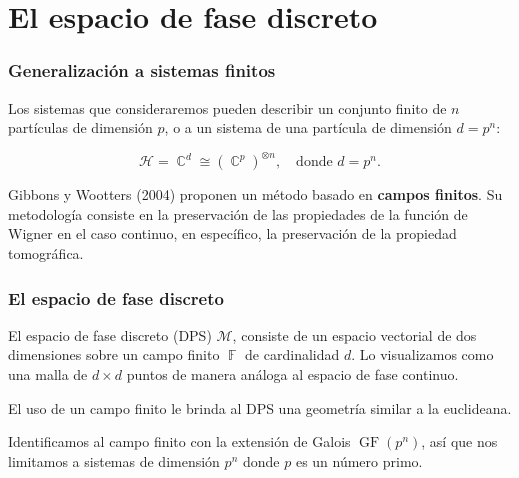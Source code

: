 \documentclass[10pt,spanish]{beamer}
\DeclareMathOperator{\C}{\mathbb{C}}
\DeclareMathOperator{\F}{\mathbb{F}}
\DeclareMathOperator{\GF}{GF}
\begin{document}
  

  
  \section{El espacio de fase discreto}

  \begin{frame}
    \frametitle{Generalización a sistemas finitos}

    Los sistemas que consideraremos pueden describir un
    conjunto finito de $n$ partículas de dimensión $p$, o a
    un sistema de una partícula de dimensión $d = p^{n}$:

    \begin{equation}
      \mathcal H
      = \C^{d}
      \cong \left( \C^{p} \right)^{\otimes n},
      \quad \text{donde } d = p^{n}.
    \end{equation}

    \vspace{15pt}

    \pause

    Gibbons y Wootters (2004) proponen un método basado en
    \textbf{campos finitos}. Su metodología consiste en la
    preservación de las propiedades de la función de Wigner
    en el caso continuo, en específico, la preservación de
    la propiedad tomográfica.
  \end{frame}

  \begin{frame}
    \frametitle{El espacio de fase discreto}

    \begin{definition}
      El espacio de fase discreto (DPS) $\mathcal M$,
      consiste de un espacio vectorial de dos dimensiones
      sobre un campo finito $\F$ de cardinalidad $d$. Lo
      visualizamos como una malla de $d \times d$ puntos de
      manera análoga al espacio de fase continuo.
    \end{definition}

    \vspace{10pt}

    \pause

    El uso de un campo finito le brinda al DPS una geometría
    similar a la euclideana.


    \vspace{10pt} 

    \pause

    Identificamos al campo finito con la extensión de Galois
    $\GF(p^{n})$, así que nos limitamos a sistemas de
    dimensión $p^{n}$ donde $p$ es un número primo.
  \end{frame}
\end{document}
